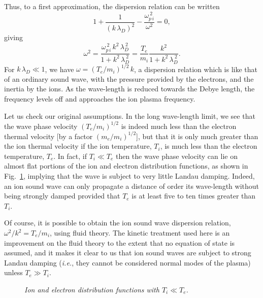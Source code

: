 Thus, to a first approximation, the dispersion relation can be written
\begin{equation}\label{e6.50}
1 + \frac{1}{(k\,\lambda_D)^2} - \frac{\omega_{p\,i}^{~2}}{\omega^2} = 0,
\end{equation}
giving
\begin{equation}
\omega^2 = \frac{\omega_{p\,i}^{~2}\,k^2\,\lambda_D^{~2}}{1+k^2\,\lambda_D^{~2}}
= \frac{T_e}{m_i} \frac{k^2}{1+k^2\,\lambda_D^{~2}}.
\end{equation}
For $k\,\lambda_D\ll 1$, we have $\omega=(T_e/m_i)^{1/2}\,k$, a dispersion relation
which is like that of an ordinary sound wave, with the pressure provided by the
electrons, and the inertia by the ions. As the wave-length is reduced towards the
Debye length, the frequency levels off and approaches the ion plasma
frequency.

Let us check our original assumptions. In the long wave-length limit, we see that
the wave phase velocity $(T_e/m_i)^{1/2}$ is indeed much less than the
electron thermal velocity [by a factor $(m_e/m_i)^{1/2}$], but that it
is only much greater than the ion thermal velocity if the ion temperature, $T_i$,
is much less than the electron temperature, $T_e$. In fact, if $T_i\ll T_e$
then the wave phase velocity can lie on almost flat portions of the
ion and electron distribution functions, as shown in Fig.~\ref{f36}, implying that
the wave is subject to
very little Landau damping. Indeed, an ion sound wave can only propagate a distance of order its wave-length
without being strongly damped  provided that $T_e$ is at least five to ten times greater than $T_i$.

Of course, it is possible to obtain the ion sound wave dispersion relation,
$\omega^2/k^2 = T_e/m_i$, using fluid theory. The kinetic treatment used here
is an improvement on the fluid theory to the extent that no equation of
state is assumed, and it makes it clear to us that ion sound waves are subject to
strong Landau damping ({\em i.e.}, they cannot be considered normal modes of the
plasma) unless $T_e\gg T_i$. 

\begin{figure}
\epsfysize=2.5in
\centerline{}
\caption{\em Ion and electron distribution functions with $T_i\ll T_e$.}\label{f36}
\end{figure}

